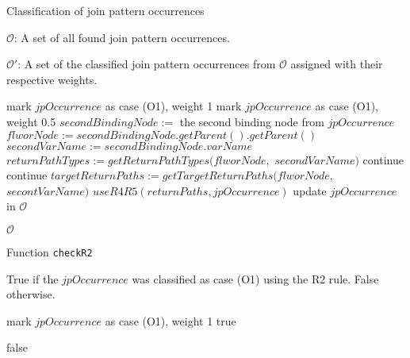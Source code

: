 \begin{algorithm}
\caption{Classification of join pattern occurrences}
\label{ALG_classification_of_join_pattern_occurrences}
\begin{algorithmic}[1]
\REQUIRE $\mathcal{O}$: A set of all found join pattern occurrences.

\ENSURE $\mathcal{O'}$: A set of the classified join pattern occurrences from $\mathcal{O}$ assigned with their respective weights.

        \STATE mark $jpOccurrence$ as case (O1), weight 1
        \STATE mark $jpOccurrence$ as case (O1), weight 0.5
    \ELSE
        \STATE $secondBindingNode :=$ the second binding node from $jpOccurrence$
        \STATE $flworNode := secondBindingNode.getParent().getParent()$
        \STATE $secondVarName := secondBindingNode.varName$
        \STATE $returnPathTypes := getReturnPathTypes(flworNode,$ $secondVarName)$
			\STATE continue
		\ENDIF
			\STATE continue
		\ENDIF
		\STATE $targetReturnPaths := getTargetReturnPaths(flworNode,$ $secontVarName)$
		\STATE $useR4R5(returnPaths, jpOccurrence)$
    \ENDIF
    \STATE update $jpOccurrence$ in $\mathcal{O}$
\ENDFOR

\RETURN $\mathcal{O}$
\end{algorithmic}
\end{algorithm}

\begin{algorithm}
\caption{Function \texttt{checkR2}}
\label{ALG_function_check_r2}
\begin{algorithmic}[1]

\ENSURE True if the $jpOccurrence$ was classified as case (O1) using the R2 rule. False otherwise.

    	\STATE mark $jpOccurrence$ as case (O1), weight 1 
  		\RETURN true
  	\ENDIF
\ENDFOR

\RETURN false
\end{algorithmic}
\end{algorithm}

